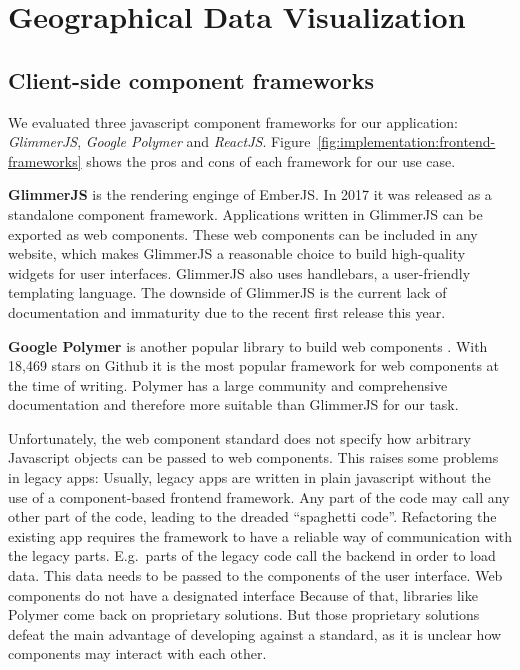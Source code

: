 \section{Geographical Data Visualization}



\subsection{Client-side component frameworks}

We evaluated three javascript component frameworks for our application: \emph{GlimmerJS}, \emph{Google Polymer} and \emph{ReactJS}.
Figure~\ref{fig:implementation:frontend-frameworks} shows the pros and cons of each framework for our use case.

\textbf{GlimmerJS} is the rendering enginge of EmberJS\cite{Ember2017}.
In 2017 it was released as a standalone component framework.
Applications written in GlimmerJS can be exported as web components.
These web components can be included in any website, which makes GlimmerJS a reasonable choice to build high-quality widgets for user interfaces.
GlimmerJS also uses handlebars\cite{Handlebars2017}, a user-friendly templating language.
The downside of GlimmerJS is the current lack of documentation and immaturity due to the recent first release this year.

\textbf{Google Polymer} is another popular library to build web components \cite{Polymer2017}.
With 18,469 stars on Github it is the most popular framework for web components at the time of writing.
Polymer has a large community and comprehensive documentation and therefore more suitable than GlimmerJS for our task.

Unfortunately, the web component standard does not specify how arbitrary Javascript objects can be passed to web components.
This raises some problems in legacy apps:
Usually, legacy apps are written in plain javascript without the use of a component-based frontend framework.
Any part of the code may call any other part of the code, leading to the dreaded ``spaghetti code''.
Refactoring the existing app requires the framework to have a reliable way of communication with the legacy parts.
E.g.\ parts of the legacy code call the backend in order to load data.
This data needs to be passed to the components of the user interface.
Web components do not have a designated interface
Because of that, libraries like Polymer come back on proprietary solutions.
But those proprietary solutions defeat the main advantage of developing against a standard, as it is unclear how components may interact with each other.

